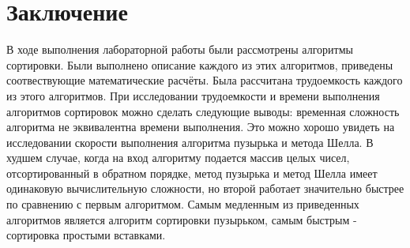 \chapter*{Заключение}
В ходе выполнения лабораторной работы были рассмотрены алгоритмы сортировки. Были выполнено описание каждого из этих алгоритмов, приведены соотвествующие математические расчёты. Была рассчитана трудоемкость каждого из этого алгоритмов. При исследовании трудоемкости и времени выполнения алгоритмов сортировок можно сделать следующие выводы: временная сложность алгоритма не эквивалентна времени выполнения. Это можно хорошо увидеть на исследовании скорости выполнения алгоритма пузырька и метода Шелла. В худшем случае, когда на вход алгоритму подается массив целых чисел, отсортированный в обратном порядке, метод пузырька и метод Шелла имеет одинаковую вычислительную сложности, но второй работает значительно быстрее по сравнению с первым алгоритмом. Самым медленным из приведенных алгоритмов является алгоритм сортировки пузырьком, самым быстрым - сортировка простыми вставками. 
  